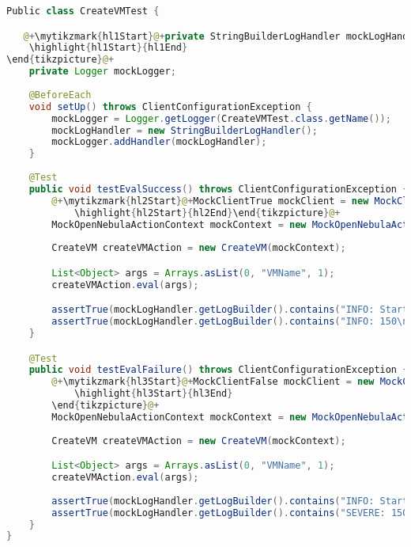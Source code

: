 \begin{lstlisting}[language=Java, caption=CreateVMTest, label=code:CreateVMTest, basicstyle=\fontsize{9}{10}\ttfamily]
Public class CreateVMTest {

   @+\mytikzmark{hl1Start}@+private StringBuilderLogHandler mockLogHandler;@+\mytikzmark{hl1End}@+@+\begin{tikzpicture}[remember picture, overlay]
    \highlight{hl1Start}{hl1End}
\end{tikzpicture}@+
	private Logger mockLogger;
	
	@BeforeEach
	void setUp() throws ClientConfigurationException {
		mockLogger = Logger.getLogger(CreateVMTest.class.getName());
		mockLogHandler = new StringBuilderLogHandler();
		mockLogger.addHandler(mockLogHandler);
	}
	
    @Test
    public void testEvalSuccess() throws ClientConfigurationException {
    	@+\mytikzmark{hl2Start}@+MockClientTrue mockClient = new MockClientTrue("150");@+\mytikzmark{hl2End}@+@+\begin{tikzpicture}[remember picture, overlay]
            \highlight{hl2Start}{hl2End}\end{tikzpicture}@+
    	MockOpenNebulaActionContext mockContext = new MockOpenNebulaActionContext(mockClient, mockLogger);
    	
        CreateVM createVMAction = new CreateVM(mockContext);

        List<Object> args = Arrays.asList(0, "VMName", 1);
        createVMAction.eval(args);

        assertTrue(mockLogHandler.getLogBuilder().contains("INFO: Starting VM: [1, VMName]\n"));
        assertTrue(mockLogHandler.getLogBuilder().contains("INFO: 150\n"));
    }

    @Test
    public void testEvalFailure() throws ClientConfigurationException {
    	@+\mytikzmark{hl3Start}@+MockClientFalse mockClient = new MockClientFalse("150");@+\mytikzmark{hl3End}@+@+\begin{tikzpicture}[remember picture, overlay]
            \highlight{hl3Start}{hl3End}
        \end{tikzpicture}@+
    	MockOpenNebulaActionContext mockContext = new MockOpenNebulaActionContext(mockClient, mockLogger);
    	
        CreateVM createVMAction = new CreateVM(mockContext);

        List<Object> args = Arrays.asList(0, "VMName", 1);
        createVMAction.eval(args);
        
        assertTrue(mockLogHandler.getLogBuilder().contains("INFO: Starting VM: [1, VMName]\n"));
        assertTrue(mockLogHandler.getLogBuilder().contains("SEVERE: 150\n"));
    }
}
\end{lstlisting}

